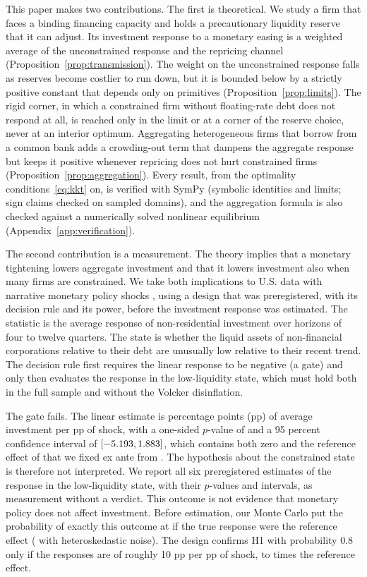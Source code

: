 \documentclass[11pt]{article}
\theoremstyle{remark}
\begin{document}
This paper makes two contributions. The first is theoretical. We study a firm that faces a binding financing capacity and
holds a precautionary liquidity reserve that it can adjust. Its investment response to a monetary easing is a weighted average
of the unconstrained response and the repricing channel
(Proposition~\ref{prop:transmission}). The weight on the unconstrained response falls as reserves become costlier to run down,
but it is bounded below by a strictly positive constant that depends only on primitives (Proposition~\ref{prop:limits}). The
rigid corner, in which a constrained firm without floating-rate debt does not respond at all, is reached only in the limit or at
a corner of the reserve choice, never at an interior optimum. Aggregating heterogeneous firms that borrow from a common bank
adds a crowding-out term that dampens the aggregate response but keeps it positive whenever repricing does not hurt
constrained firms (Proposition~\ref{prop:aggregation}). Every result, from the optimality conditions~\eqref{eq:kkt} on, is verified with SymPy (symbolic identities and limits; sign
claims checked on sampled domains), and the aggregation formula
is also checked against a numerically solved nonlinear equilibrium (Appendix~\ref{app:verification}).

The second contribution is a measurement. The theory implies that a monetary tightening lowers aggregate investment and that it
lowers investment also when many firms are constrained. We take both implications to U.S. data with narrative monetary policy
shocks \citep{RomerRomer2004}, using a design that was preregistered, with its decision rule and its power, before the
investment response was estimated. The statistic is the average response of non-residential investment over horizons of four
to twelve quarters. The state is whether the liquid assets of non-financial corporations relative to their debt are unusually
low relative to their recent trend. The decision rule first requires the linear response to be negative (a gate) and only then evaluates the
response in the low-liquidity state, which must hold both in the full sample and without the Volcker disinflation.

The gate fails. The linear estimate is \bLinEst{} percentage points (pp) of average investment per pp of shock, with a
one-sided $p$-value of \bLinP{} and a 95 percent confidence interval of $[-5.193, 1.883]$, which contains both zero and the
reference effect of \betaRef{} that we fixed ex ante from \citet{TenreyroThwaites2016}. The hypothesis about the constrained state is
therefore not interpreted. We report all six preregistered estimates of the response in the low-liquidity state, with
their $p$-values and intervals, as measurement without a verdict. This outcome is not evidence that monetary policy does not
affect investment. Before estimation, our Monte Carlo put the probability of exactly this outcome at \PwHomoHzeroFalla{} if the
true response were the reference effect (\PwHetHzeroFalla{} with heteroskedastic noise). The design confirms H1 with probability
0.8 only if the responses are of roughly 10 pp per pp of shock, \MdeHetC{} to \MdeHomoC{} times the reference effect. %
\end{document}
